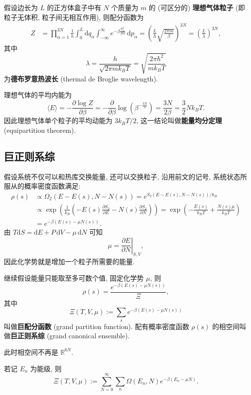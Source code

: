\begin{example}[理想气体]
    \label{ideal gas}
    假设边长为 $ L $ 的正方体盒子中有 $ N $ 个质量为 $ m $ 的 (可区分的) {\bf 理想气体粒子} (即粒子无体积, 粒子间无相互作用), 则配分函数为
    \begin{align*}
        Z&=\prod_{\alpha=1}^{3N}\frac{1}{h}\int_0^L\mathrm{d}q_\alpha\int_{-\infty}^{\infty}e^{-\beta\frac{p_\alpha^2}{2m}}\,\mathrm{d}p_\alpha=\left( \frac{L}{h}\sqrt{\frac{2\pi m}{\beta}} \right)^{3N}=\left( \frac{L}{\lambda} \right)^{3N},
    \end{align*}
    其中 
    \[ \lambda=\frac{h}{\sqrt{2\pi mk_BT}}=\sqrt{\frac{2\pi\hbar^2}{mk_BT}} \]
    为{\bf 德布罗意热波长} (thermal de Broglie wavelength).

    理想气体的平均内能为
    \[ \langle E\rangle=-\frac{\partial\log Z}{\partial\beta}=-\frac{\partial}{\partial\beta}\log\left( \beta^{-\frac{3N}{2}} \right)=\frac{3N}{2\beta}=\frac{3}{2}Nk_BT. \]
    因此理想气体单个粒子的平均动能为 $ 3k_BT/2 $, 这一结论叫做{\bf 能量均分定理} (equipartition theorem).
\end{example}
\subsection{巨正则系综}
假设系统不仅可以和热库交换能量, 还可以交换粒子, 沿用前文的记号, 系统状态所服从的概率密度函数满足:
\begin{align*}
    \rho(s) &\propto \Omega_2(E-E(s),N-N(s))=e^{S_2(E-E(s),N-N(s))/k_B}\\ 
    &\propto \exp\left( \frac{1}{k_B}\left( -E(s)\frac{\partial S_2}{\partial E}-N(s)\frac{\partial S_2}{\partial N} \right) \right)= \exp\left( -\frac{E(s)}{k_BT}+\frac{N(s)\mu}{k_BT} \right)\\ 
    &=e^{-\beta(E(s)-\mu N(s))}.
\end{align*}
由 $ T\mathrm{d}S=\mathrm{d}E+P\,\mathrm{d}V-\mu\,\mathrm{d}N $ 可知
\[ \mu=\left.\frac{\partial E}{\partial N}\right|_{S,V}, \]
因此化学势就是增加一个粒子所需要的能量.

继续假设能量只能取至多可数个值, 固定化学势 $ \mu $, 则
\[ \rho(s)=\frac{e^{-\beta(E(s)-\mu N(s))}}{\Xi}, \]
其中
\[ \Xi(T,V,\mu):=\sum_{s}e^{-\beta(E(s)-\mu N(s))} \]
叫做{\bf 巨配分函数} (grand partition function). 配有概率密度函数 $ \rho(s) $ 的相空间叫做{\bf 巨正则系综} (grand canonical ensemble).
\begin{remark}
    此时相空间不再是 $\mathbb{R}^{6N}$.
\end{remark}
\begin{remark}
    若记 $E_n$ 为能级, 则
    \[ \Xi(T,V,\mu):=\sum_{N=0}^{\infty}\sum_n \Omega(E_n,N)e^{-\beta(E_n-\mu N)}. \]
\end{remark}

